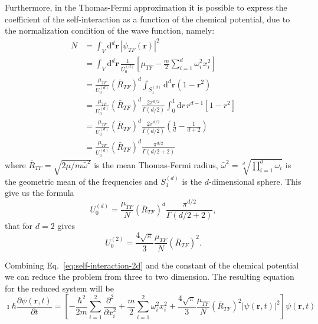 Furthermore, in the Thomas-Fermi approximation it is possible to express the coefficient of the self-interaction as a function of the chemical potential, due to the normalization condition of the wave function, namely:
\begin{equation}
\begin{split}
N & = \int_V \mathrm{d}^d \textbf{r} \, |\psi_{TF}(\textbf{r})|^2 \\
& = \int_V \mathrm{d}^d \textbf{r} \, \frac{1}{U_0^{(d)}} \left[ \mu_{TF} - \frac{m}{2} \sum_{i=1}^d \omega_i^2 x_i^2 \right] \\
& = \frac{\mu_{TF}}{U_0^{(d)}} \left( \bar{R}_{TF} \right)^d \int_{S_1^{(d)}} \mathrm{d}^d \textbf{r} (1 - \textbf{r}^2) \\ 
& = \frac{\mu_{TF}}{U_0^{(d)}} \left( \bar{R}_{TF} \right)^d \frac{2\pi^{d/2}}{\Gamma(d/2)} \int_0^1 \mathrm{d}r \, r^{d-1} [1 - r^2] \\
& = \frac{\mu_{TF}}{U_0^{(d)}} \left( \bar{R}_{TF} \right)^d \frac{2\pi^{d/2}}{\Gamma(d/2)} \left( \frac{1}{d} - \frac{1}{d+2} \right) \\
& = \frac{\mu_{TF}}{U_0^{(d)}} \left( \bar{R}_{TF} \right)^d \frac{\pi^{d/2}}{\Gamma(d/2 + 2)}
\end{split}
\end{equation}
where $\bar{R}_{TF} = \sqrt{2\mu / m \bar{\omega}^2}$ is the mean Thomas-Fermi radius, $\bar{\omega}^2 = \sqrt[d]{\prod_{i=1}^d \omega_i}$ is the geometric mean of the frequencies and $S_1^{(d)}$ is the $d$-dimensional sphere.
This give us the formula
\begin{equation}
U_0^{(d)} = \frac{\mu_{TF}}{N} \left( \bar{R}_{TF} \right)^d \frac{\pi^{d/2}}{\Gamma(d/2 + 2)},
\end{equation}
that for $d=2$ gives
\begin{equation} \label{eq:self-interaction-2d}
U_0^{(2)} = \frac{4\sqrt{\pi}}{3} \frac{\mu_{TF}}{N} \left( \bar{R}_{TF} \right)^2.
\end{equation}

Combining Eq.~\eqref{eq:self-interaction-2d} and the constant of the chemical potential we can reduce the problem from three to two dimension. The resulting equation for the reduced system will be
\begin{equation}
\imath \hbar \frac{\partial \psi(\textbf{r}, t)}{\partial t} = \left[ - \frac{\hbar^2}{2m} \sum_{i=1}^2 \frac{\partial^2}{\partial x_i^2} + \frac{m}{2} \sum_{i=1}^2 \omega_i^2 x_i^2 + \frac{4\sqrt{\pi}}{3} \frac{\mu_{TF}}{N} \left( \bar{R}_{TF} \right)^2 |\psi(\textbf{r}, t)|^2 \right] \psi(\textbf{r}, t)
\end{equation}